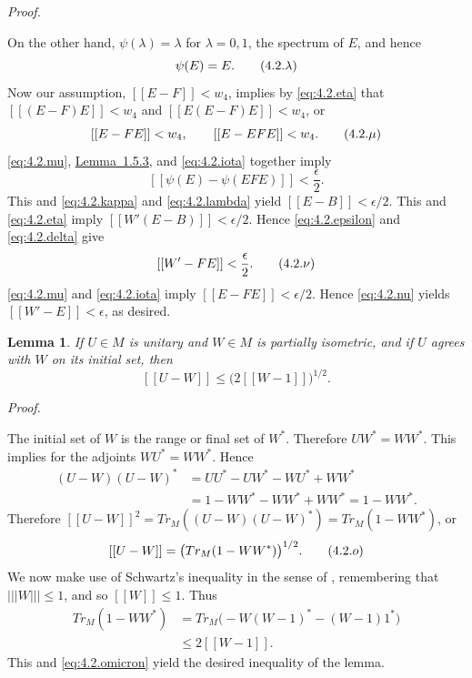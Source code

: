 \documentclass[b5paper,twoside]{article}
\newcommand{\lemref}[2]{\hyperref[#1]{\mbox{Lemma~#2}}}
\theoremstyle{mvnplain}
\newtheorem{lemma}{Lemma}[section]
\renewenvironment{proof}[1][Proof]{%
  \par\addvspace{0.35\baselineskip}%
  \noindent\textit{#1.}\ \normalfont\ignorespaces
}{%
  \par\addvspace{0.35\baselineskip}%
}
\newcommand{\M}{\mathbf M}
\newcommand{\Metric}[1]{\left[\!\left[#1\right]\!\right]}
\newcommand{\OpNorm}[1]{\left\lvert\left\lvert\left\lvert#1\right\rvert\right\rvert\right\rvert}
\def\M{M}%
\def\Metric#1{[[#1]]}%
\def\operatorname#1{#1}%
\begin{document}
\begin{proof}
On the other hand, \(\psi(\lambda)=\lambda\) for \(\lambda=0,1\), the
spectrum of \(E\), and hence
\begin{equation}\label{eq:4.2.lambda}
  \psi(E)=E.
  \tag{4.2.\ensuremath{\lambda}}
\end{equation}
Now our assumption, \(\Metric{E-F}<w_4\), implies by
\eqref{eq:4.2.eta} that \(\Metric{(E-F)E}<w_4\) and
\(\Metric{E(E-F)E}<w_4\), or
\begin{equation}\label{eq:4.2.mu}
 \Metric{E-FE}<w_4,\qquad \Metric{E-EFE}<w_4.
  \tag{4.2.\ensuremath{\mu}}
\end{equation}
\eqref{eq:4.2.mu}, \lemref{lem:1.5.3}{1.5.3}, and
\eqref{eq:4.2.iota} together imply
\[
  \Metric{\psi(E)-\psi(EFE)}<\frac{\epsilon}{2}.
\]
This and \eqref{eq:4.2.kappa} and \eqref{eq:4.2.lambda} yield
\(\Metric{E-B}<\epsilon/2\). This and \eqref{eq:4.2.eta} imply
\(\Metric{W'(E-B)}<\epsilon/2\). Hence \eqref{eq:4.2.epsilon} and
\eqref{eq:4.2.delta} give
\begin{equation}\label{eq:4.2.nu}
  \Metric{W'-FE}<\frac{\epsilon}{2}.
  \tag{4.2.\ensuremath{\nu}}
\end{equation}
\eqref{eq:4.2.mu} and \eqref{eq:4.2.iota} imply
\(\Metric{E-FE}<\epsilon/2\). Hence \eqref{eq:4.2.nu} yields
\(\Metric{W'-E}<\epsilon\), as desired.
\end{proof}

\begin{lemma}\label{lem:4.2.3}
If \(U\in\M\) is unitary and \(W\in\M\) is partially isometric, and if
\(U\) agrees with \(W\) on its initial set, then
\[
  \Metric{U-W}\le\bigl(2\Metric{W-1}\bigr)^{1/2}.
\]
\end{lemma}

\begin{proof}
The initial set of \(W\) is the range or final set of \(W^*\). Therefore
\(UW^*=WW^*\). This implies for the adjoints \(WU^*=WW^*\). Hence
\[
\begin{aligned}
(U-W)(U-W)^*
 &=UU^*-UW^*-WU^*+WW^*\\
 &=1-WW^*-WW^*+WW^*=1-WW^*.
\end{aligned}
\]
Therefore
\(\Metric{U-W}^2
=\operatorname {Tr}_{\M}((U-W)(U-W)^*)
=\operatorname {Tr}_{\M}(1-WW^*)\), or
\begin{equation}\label{eq:4.2.omicron}
  \Metric{U-W}=\bigl(\operatorname {Tr}_{\M}(1-WW^*)\bigr)^{1/2}.
  \tag{4.2.\ensuremath{o}}
\end{equation}
We now make use of Schwartz's inequality in the sense of
\cite[p.~241, Theorem~VIII]{ref6}, remembering that \(\OpNorm{W}\le1\), and
so \(\Metric{W}\le1\). Thus
\[
\begin{aligned}
\operatorname {Tr}_{\M}(1-WW^*)
 &=\operatorname {Tr}_{\M}\bigl(-W(W-1)^*-(W-1)1^*\bigr)\\
 &\le2\Metric{W-1}.
\end{aligned}
\]
This and \eqref{eq:4.2.omicron} yield the desired inequality of the lemma.
\end{proof}
\end{document}
